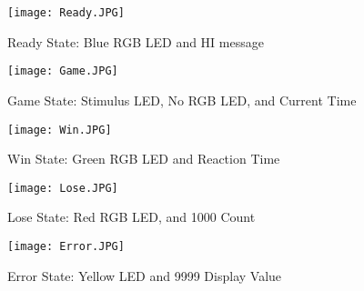 \documentclass{article}
\begin{document}
\begin{center}
	\begin{figure}
		\texttt{[image: Ready.JPG]}
		\caption{Ready State: Blue RGB LED and HI message}
		\label{fig:ReadyImg}
	\end{figure}

	\begin{figure}
		\texttt{[image: Game.JPG]}
		\caption{Game State: Stimulus LED, No RGB LED, and Current Time}
		\label{fig:GameImg}
	\end{figure}

	\begin{figure}
		\texttt{[image: Win.JPG]}
		\caption{Win State: Green RGB LED and Reaction Time}
		\label{fig:WinImg}
	\end{figure}

	\begin{figure}
		\texttt{[image: Lose.JPG]}
		\caption{Lose State:  Red RGB LED, and 1000 Count}
		\label{fig:LoseImg}
	\end{figure}

	\begin{figure}
		\texttt{[image: Error.JPG]}
		\caption{Error State: Yellow LED and 9999 Display Value}
		\label{fig:ReadyImg}
	\end{figure}
\end{center}
\end{document}
